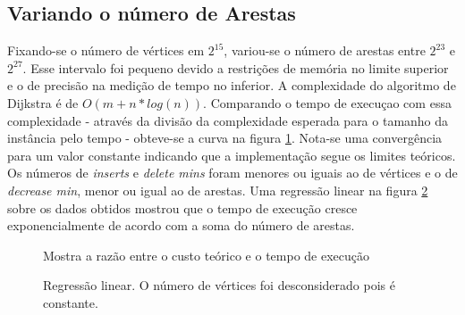 \documentclass{iiufrgs}
\begin{document}
\subsection{Variando o número de Arestas}
Fixando-se o número de vértices em $2^{15}$, variou-se o número de arestas entre $2^{23}$ e $2^{27}$. Esse intervalo
foi pequeno devido a restrições de memória no limite superior e o de precisão na medição de tempo no inferior.
A complexidade do algoritmo de Dijkstra é de $O(m + n*log(n))$. Comparando o tempo de execuçao com essa complexidade - 
através da divisão da complexidade esperada para o tamanho da instância pelo tempo - obteve-se a curva na figura 
\ref{fig:dij_vertex}. Nota-se uma convergência para um valor constante indicando que a implementação segue os limites
teóricos.
Os números de \textit{inserts} e \textit{delete mins} foram
menores ou iguais ao de vértices e o de \textit{decrease min}, menor ou igual ao de arestas. Uma regress\~ao
linear na figura \ref{fig:dij_vertex_linear_regression} sobre os dados obtidos mostrou que o tempo de execução
cresce exponencialmente de acordo com a soma do número de arestas.

\begin{figure}[H]
\centering

\caption{Mostra a raz\~ao entre o custo teórico e o tempo de execução}
\label{fig:dij_vertex}
\end{figure}


\begin{figure}[H]
\centering

\caption{Regress\~ao linear. O número de vértices foi desconsiderado pois é constante.}
\label{fig:dij_vertex_linear_regression}
\end{figure}
\end{document}
